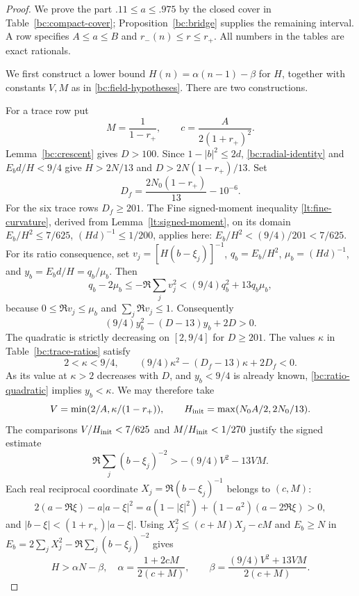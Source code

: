 \begin{proof}
We prove the part $.11\leq a\leq.975$ by the closed cover in
Table~\ref{bc:compact-cover}; Proposition~\ref{bc:bridge} supplies
the remaining interval.  A row specifies $A\leq a\leq B$ and
$r_-(n)\leq r\leq r_+$.
All numbers in the tables are exact rationals.

We first construct a lower bound $H(n)=\alpha(n-1)-\beta$ for $H$,
together with constants $V,M$ as in \eqref{bc:field-hypotheses}.
There are two constructions.

For a trace row put
\[
 M=\frac1{1-r_+},\qquad c=\frac{A}{2(1+r_+)^2}.
\]
Lemma~\ref{bc:crescent} gives $D>100$.
Since $1-|b|^2\leq2d$, \eqref{bc:radial-identity} and
$E_bd/H<9/4$ give $H>2N/13$ and
$D>2N(1-r_+)/13$.
Set
\begin{equation}\label{bc:Dfloor}
 D_f=\frac{2N_0(1-r_+)}{13}-10^{-6}.
\end{equation}
For the six trace rows $D_f\geq201$.
The Fine signed-moment inequality \eqref{lt:fine-curvature}, derived
from Lemma~\ref{lt:signed-moment},
on its domain $E_b/H^2\leq7/625$, $(Hd)^{-1}\leq1/200$,
applies here: $E_b/H^2<(9/4)/201<7/625$.
For its ratio consequence, set
$v_j=[H(b-\xi_j)]^{-1}$, $q_b=E_b/H^2$,
$\mu_b=(Hd)^{-1}$, and $y_b=E_bd/H=q_b/\mu_b$.
Then
\[
 q_b-2\mu_b
 \leq-\Re\sum_jv_j^2
 <(9/4)q_b^2+13q_b\mu_b,
\]
because $0\leq\Re v_j\leq\mu_b$ and
$\sum_j\Re v_j\leq1$.
Consequently
\begin{equation}\label{bc:ratio-quadratic}
 (9/4)y_b^2-(D-13)y_b+2D>0.
\end{equation}
The quadratic is strictly decreasing on $[2,9/4]$ for $D\geq201$.
The values $\kappa$ in Table~\ref{bc:trace-ratios} satisfy
\begin{equation}\label{bc:kappa-gate}
 2<\kappa<9/4,\qquad
 (9/4)\kappa^2-(D_f-13)\kappa+2D_f<0.
\end{equation}
As its value at $\kappa>2$ decreases with $D$, and $y_b<9/4$ is
already known, \eqref{bc:ratio-quadratic} implies $y_b<\kappa$.
We may therefore take
\[
 V=\min(2/A,\kappa/(1-r_+)),\qquad
 H_{\rm init}=\max(N_0A/2,2N_0/13).
\]
The comparisons $V/H_{\rm init}<7/625$ and
$M/H_{\rm init}<1/270$ justify the signed estimate
\[
 \Re\sum_j(b-\xi_j)^{-2}>-(9/4)V^2-13VM.
\]
Each real reciprocal coordinate
$X_j=\Re(b-\xi_j)^{-1}$ belongs to $(c,M)$:
\[
 2(a-\Re\xi)-a|a-\xi|^2
 =a(1-|\xi|^2)+(1-a^2)(a-2\Re\xi)>0,
\]
and $|b-\xi|<(1+r_+)|a-\xi|$.
Using $X_j^2\leq(c+M)X_j-cM$ and $E_b\geq N$ in
$E_b=2\sum_jX_j^2-\Re\sum_j(b-\xi_j)^{-2}$ gives
\begin{equation}\label{bc:trace-field}
 H>\alpha N-\beta,\quad
 \alpha=\frac{1+2cM}{2(c+M)},\qquad
 \beta=\frac{(9/4)V^2+13VM}{2(c+M)}.
\end{equation}


\end{proof}
